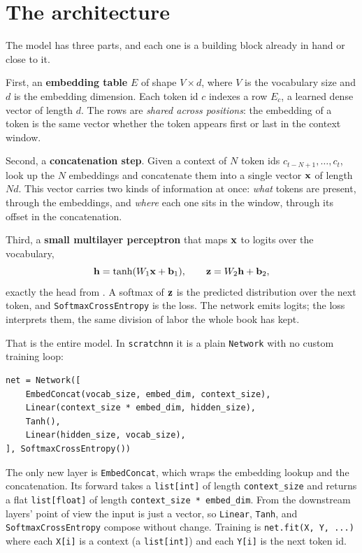 
\section{The architecture}\label{sec:bengio-arch}

The model has three parts, and each one is a building block already in
hand or close to it.

First, an \textbf{embedding table} $E$ of shape $V \times d$, where $V$ is
the vocabulary size and $d$ is the embedding dimension. Each token id $c$
indexes a row $E_c$, a learned dense vector of length $d$. The rows are
\emph{shared across positions}: the embedding of a token is the same
vector whether the token appears first or last in the context window.

Second, a \textbf{concatenation step}. Given a context of $N$ token ids
$c_{t-N+1}, \ldots, c_t$, look up the $N$ embeddings and concatenate them
into a single vector $\mathbf{x}$ of length $Nd$. This vector carries two kinds
of information at once: \emph{what} tokens are present, through the
embeddings, and \emph{where} each one sits in the window, through its
offset in the concatenation.

Third, a \textbf{small multilayer perceptron} that maps $\mathbf{x}$ to logits
over the vocabulary,
\[
  \mathbf{h} = \tanh(W_1 \mathbf{x} + \mathbf{b}_1), \qquad
  \mathbf{z} = W_2 \mathbf{h} + \mathbf{b}_2,
\]
exactly the head from . A softmax of $\mathbf{z}$ is the
predicted distribution over the next token, and
\texttt{SoftmaxCrossEntropy} is the loss. The network emits logits; the
loss interprets them, the same division of labor the whole book has kept.

That is the entire model. In \texttt{scratchnn} it is a plain
\texttt{Network} with no custom training loop:
\begin{lstlisting}
net = Network([
    EmbedConcat(vocab_size, embed_dim, context_size),
    Linear(context_size * embed_dim, hidden_size),
    Tanh(),
    Linear(hidden_size, vocab_size),
], SoftmaxCrossEntropy())
\end{lstlisting}
The only new layer is \texttt{EmbedConcat}, which wraps the embedding
lookup and the concatenation. Its forward takes a \texttt{list[int]} of
length \texttt{context\_size} and returns a flat \texttt{list[float]} of
length \texttt{context\_size * embed\_dim}. From the downstream layers'
point of view the input is just a vector, so \texttt{Linear},
\texttt{Tanh}, and \texttt{SoftmaxCrossEntropy} compose without change.
Training is \texttt{net.fit(X, Y, ...)} where each \texttt{X[i]} is a
context (a \texttt{list[int]}) and each \texttt{Y[i]} is the next token id.

